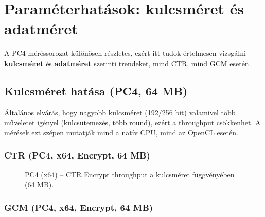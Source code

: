\chapter{Paraméterhatások: kulcsméret és adatméret}

A PC4 méréssorozat különösen részletes, ezért itt tudok értelmesen vizsgálni
\textbf{kulcsméret} és \textbf{adatméret} szerinti trendeket, mind CTR, mind GCM esetén.

\section{Kulcsméret hatása (PC4, 64 MB)}

Általános elvárás, hogy nagyobb kulcsméret (192/256 bit) valamivel több műveletet igényel
(kulcsütemezés, több round), ezért a throughput csökkenhet. A mérések ezt szépen mutatják
mind a natív CPU, mind az OpenCL esetén.

\subsection{CTR (PC4, x64, Encrypt, 64 MB)}

\begin{figure}[H]
  \centering
  \caption{PC4 (x64) -- CTR Encrypt throughput a kulcsméret függvényében (64 MB).}
\end{figure}

\subsection{GCM (PC4, x64, Encrypt, 64 MB)}

